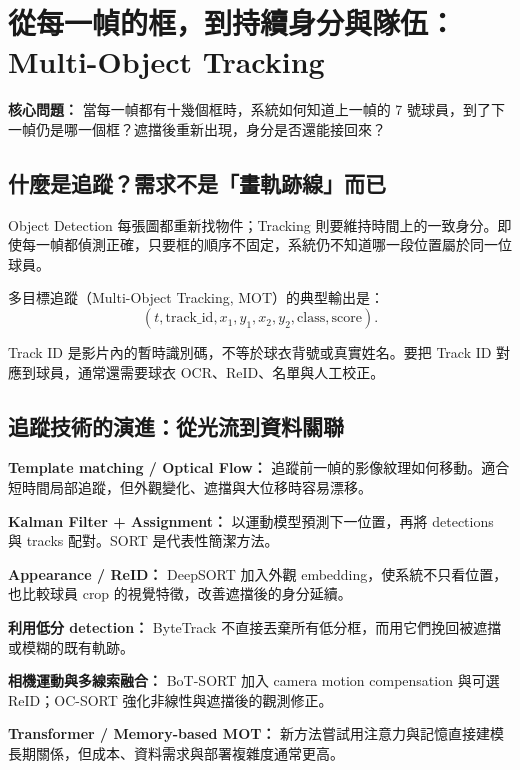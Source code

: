 \documentclass[11pt,a4paper,oneside]{report}
\begin{document}
\chapter{從每一幀的框，到持續身分與隊伍：Multi-Object Tracking}

\begin{heroBox}
\textbf{核心問題：}\quad
當每一幀都有十幾個框時，系統如何知道上一幀的 7 號球員，到了下一幀仍是哪一個框？遮擋後重新出現，身分是否還能接回來？
\end{heroBox}

\section{什麼是追蹤？需求不是「畫軌跡線」而已}

\begin{conceptBox}
Object Detection 每張圖都重新找物件；Tracking 則要維持時間上的一致身分。即使每一幀都偵測正確，只要框的順序不固定，系統仍不知道哪一段位置屬於同一位球員。
\end{conceptBox}

多目標追蹤（Multi-Object Tracking, MOT）的典型輸出是：
\[
(t,\mathrm{track\_id},x_1,y_1,x_2,y_2,\mathrm{class},\mathrm{score}).
\]

Track ID 是影片內的暫時識別碼，不等於球衣背號或真實姓名。要把 Track ID 對應到球員，通常還需要球衣 OCR、ReID、名單與人工校正。

\section{追蹤技術的演進：從光流到資料關聯}

\begin{historyBox}
\textbf{Template matching / Optical Flow：}\quad
追蹤前一幀的影像紋理如何移動。適合短時間局部追蹤，但外觀變化、遮擋與大位移時容易漂移。

\textbf{Kalman Filter + Assignment：}\quad
以運動模型預測下一位置，再將 detections 與 tracks 配對。SORT 是代表性簡潔方法。

\textbf{Appearance / ReID：}\quad
DeepSORT 加入外觀 embedding，使系統不只看位置，也比較球員 crop 的視覺特徵，改善遮擋後的身分延續。

\textbf{利用低分 detection：}\quad
ByteTrack 不直接丟棄所有低分框，而用它們挽回被遮擋或模糊的既有軌跡。

\textbf{相機運動與多線索融合：}\quad
BoT-SORT 加入 camera motion compensation 與可選 ReID；OC-SORT 強化非線性與遮擋後的觀測修正。

\textbf{Transformer / Memory-based MOT：}\quad
新方法嘗試用注意力與記憶直接建模長期關係，但成本、資料需求與部署複雜度通常更高。
\end{historyBox}
\end{document}

